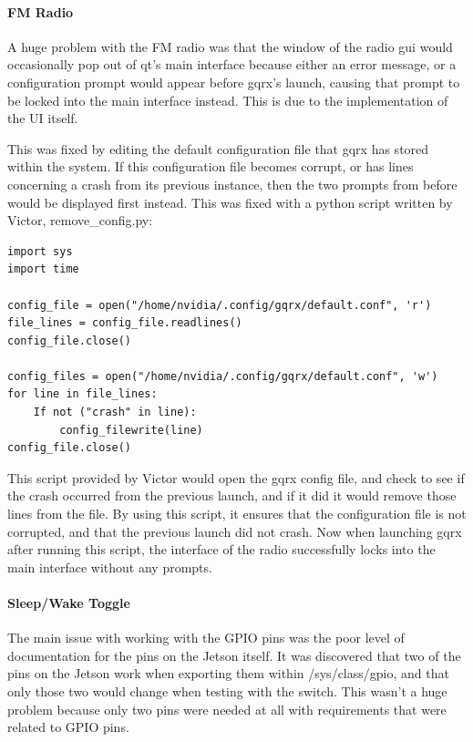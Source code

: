 \documentclass[onecolumn, draftclsnofoot, 10pt, compsoc]{IEEEtran}
\begin{document}
\paragraph{\textbf{FM Radio}}
A huge problem with the FM radio was that the window of the radio gui would occasionally pop out of qt's main interface because either an error message, or a configuration prompt would appear before gqrx's launch, causing that prompt to be locked into the main interface instead. This is due to the implementation of the UI itself.

This was fixed by editing the default configuration file that gqrx has stored within the system. If this configuration file becomes corrupt, or has lines concerning a crash from its previous instance, then the two prompts from before would be displayed first instead. This was fixed with a python script written by Victor, remove\_config.py:

\begin{verbatim}
import sys
import time

config_file = open("/home/nvidia/.config/gqrx/default.conf", 'r')
file_lines = config_file.readlines()
config_file.close()

config_files = open("/home/nvidia/.config/gqrx/default.conf", 'w')
for line in file_lines:
	If not ("crash" in line):
		config_filewrite(line)
config_file.close()
\end{verbatim}

This script provided by Victor would open the gqrx config file, and check to see if the crash occurred from the previous launch, and if it did it would remove those lines from the file. By using this script, it ensures that the configuration file is not corrupted, and that the previous launch did not crash. Now when launching gqrx after running this script, the interface of the radio successfully locks into the main interface without any prompts. \par

\paragraph{\textbf{Sleep/Wake Toggle}}
The main issue with working with the GPIO pins was the poor level of documentation for the pins on the Jetson itself. It was discovered that two of the pins on the Jetson work when exporting them within /sys/class/gpio, and that only those two would change when testing with the switch. This wasn't a huge problem because only two pins were needed at all with requirements that were related to GPIO pins. \par
\end{document}

